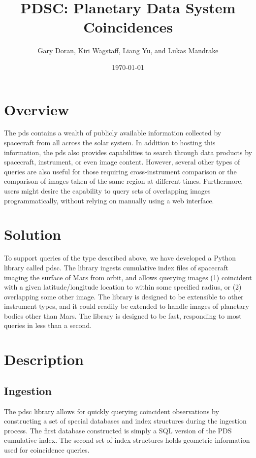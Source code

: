 \documentclass[twocolumn]{extarticle}
\title{
  PDSC: Planetary Data System Coincidences
}
\author{Gary Doran, Kiri Wagstaff, Liang Yu, and Lukas Mandrake}
\date{\today}
\begin{document}
\maketitle

\section*{Overview}
The \ac{pds} contains a wealth of publicly available information collected by
spacecraft from all across the solar system. In addition to hosting this
information, the \ac{pds} also provides capabilities to search through data
products by spacecraft, instrument, or even image content. However, several
other types of queries are also useful for those requiring cross-instrument
comparison or the comparison of images taken of the same region at different
times. Furthermore, users might desire the capability to query sets of
overlapping images programmatically, without relying on manually using a web
interface.

\section*{Solution}
To support queries of the type described above, we have developed a Python
library called \ac{pdsc}. The library ingests cumulative index files of
spacecraft imaging the surface of Mars from orbit, and allows querying images
(1) coincident with a given latitude/longitude location to within some
specified radius, or (2) overlapping some other image. The library is designed
to be extensible to other instrument types, and it could readily be extended to
handle images of planetary bodies other than Mars. The library is designed to
be fast, responding to most queries in less than a second.

\section*{Description}

\subsection*{Ingestion}
The \ac{pdsc} library allows for quickly querying coincident observations by
constructing a set of special databases and index structures during the
ingestion process. The first database constructed is simply a SQL version of the
PDS cumulative index. The second set of index structures holds geometric
information used for coincidence queries.
\end{document}
